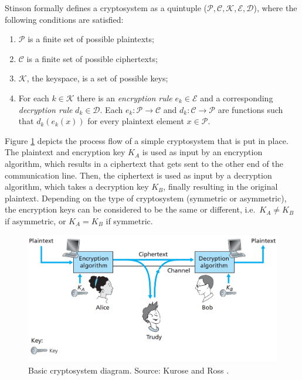 Stinson \cite{stinson2005cryptography} formally defines a cryptosystem as a quintuple ($\mathcal{P}, \mathcal{C}, \mathcal{K}, \mathcal{E}, \mathcal{D}$), where the following conditions are satisfied:
\begin{enumerate}
\item $\mathcal{P}$ is a finite set of possible plaintexts;
\item $\mathcal{C}$ is a finite set of possible ciphertexts;
\item $\mathcal{K}$, the keyspace, is a set of possible keys;
\item For each $k \in \mathcal{K}$ there is an \textit{encryption rule} $ e_{k} \in \mathcal{E}$  and a corresponding \textit{decryption rule} $ d_{k} \in \mathcal{D}$. Each $e_{k}: \mathcal{P} \rightarrow \mathcal{C}$ and $d_{k}: \mathcal{C} \rightarrow \mathcal{P}$ are functions such that $d_{k}(e_{k}(x))$ for every plaintext element $x \in \mathcal{P}$.
\end{enumerate}

Figure \ref{fig:cryptoflow} depicts the process flow of a simple cryptosystem that is put in place. The plaintext and encryption key $K_A$ is used as input by an encryption algorithm, which results in a ciphertext that gets sent to the other end of the communication line. Then, the ciphertext is used as input by a decryption algorithm, which takes a decryption key $K_B$, finally resulting in the original plaintext. Depending on the type of cryptosystem (symmetric or asymmetric), the encryption keys can be considered to be the same or different, i.e.\ $K_{A}\ne K_{B}$ if asymmetric, or $K_{A} = K_{B}$ if symmetric.

\begin{figure}[H]
  \centerline{\includegraphics[width=14cm]{img/basic_crypto}}
  \caption[Basic cryptosystem diagram]{Basic cryptosystem diagram. Source: Kurose and Ross \cite{kurose2010computer}.}
  \label{fig:cryptoflow}
\end{figure}


